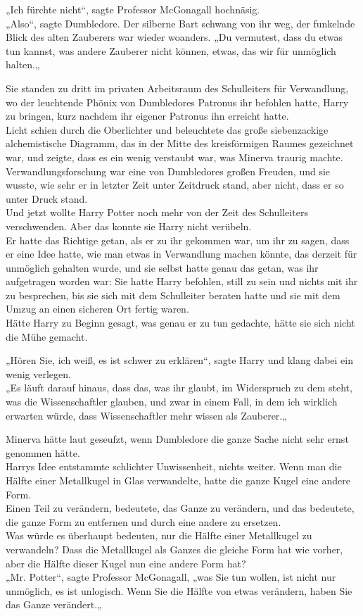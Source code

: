 {„Ich fürchte nicht“, sagte Professor McGonagall hochnäsig.\\ „Also“, sagte Dumbledore. Der silberne Bart schwang von ihr weg, der funkelnde Blick des alten Zauberers war wieder woanders. „Du vermutest, dass du etwas tun kannst, was andere Zauberer nicht können, etwas, das wir für unmöglich halten.„

Sie standen zu dritt im privaten Arbeitsraum des Schulleiters für Verwandlung, wo der leuchtende Phönix von Dumbledores Patronus ihr befohlen hatte, Harry zu bringen, kurz nachdem ihr eigener Patronus ihn erreicht hatte.\\ Licht schien durch die Oberlichter und beleuchtete das große siebenzackige alchemistische Diagramm, das in der Mitte des kreisförmigen Raumes gezeichnet war, und zeigte, dass es ein wenig verstaubt war, was Minerva traurig machte.\\ Verwandlungsforschung war eine von Dumbledores großen Freuden, und sie wusste, wie sehr er in letzter Zeit unter Zeitdruck stand, aber nicht, dass er so unter Druck stand.\\ Und jetzt wollte Harry Potter noch mehr von der Zeit des Schulleiters verschwenden. Aber das konnte sie Harry nicht verübeln.\\ Er hatte das Richtige getan, als er zu ihr gekommen war, um ihr zu sagen, dass er eine Idee hatte, wie man etwas in Verwandlung machen könnte, das derzeit für unmöglich gehalten wurde, und sie selbst hatte genau das getan, was ihr aufgetragen worden war: Sie hatte Harry befohlen, still zu sein und nichts mit ihr zu besprechen, bis sie sich mit dem Schulleiter beraten hatte und sie mit dem Umzug an einen sicheren Ort fertig waren.\\ Hätte Harry zu Beginn gesagt, was genau er zu tun gedachte, hätte sie sich nicht die Mühe gemacht.

„Hören Sie, ich weiß, es ist schwer zu erklären“, sagte Harry und klang dabei ein wenig verlegen.\\ „Es läuft darauf hinaus, dass das, was ihr glaubt, im Widerspruch zu dem steht, was die Wissenschaftler glauben, und zwar in einem Fall, in dem ich wirklich erwarten würde, dass Wissenschaftler mehr wissen als Zauberer.„

Minerva hätte laut geseufzt, wenn Dumbledore die ganze Sache nicht sehr ernst genommen hätte.\\ Harrys Idee entstammte schlichter Unwissenheit, nichts weiter. Wenn man die Hälfte einer Metallkugel in Glas verwandelte, hatte die ganze Kugel eine andere Form.\\ Einen Teil zu verändern, bedeutete, das Ganze zu verändern, und das bedeutete, die ganze Form zu entfernen und durch eine andere zu ersetzen.\\ Was würde es überhaupt bedeuten, nur die Hälfte einer Metallkugel zu verwandeln? Dass die Metallkugel als Ganzes die gleiche Form hat wie vorher, aber die Hälfte dieser Kugel nun eine andere Form hat?\\ „Mr. Potter“, sagte Professor McGonagall, „was Sie tun wollen, ist nicht nur unmöglich, es ist unlogisch. Wenn Sie die Hälfte von etwas verändern, haben Sie das Ganze verändert.„

}
